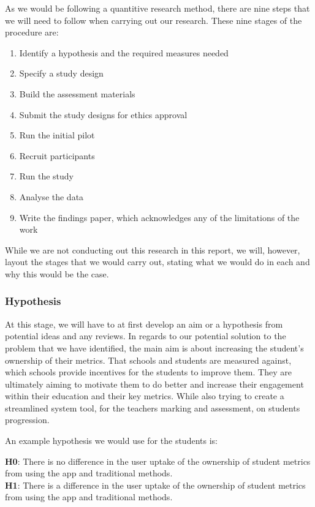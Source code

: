 \documentclass[sigchi]{acmart}
\begin{document}
As we would be following a quantitive research method, there are nine steps that we will need to follow when carrying out our research. These nine stages of the procedure are:

\begin{enumerate}
	
	\item Identify a hypothesis and the required measures needed
	\item Specify a study design
	\item Build the assessment materials
	\item Submit the study designs for ethics approval
	\item Run the initial pilot
	\item Recruit participants
	\item Run the study
	\item Analyse the data
	\item Write the findings paper, which acknowledges any of the limitations of the work
\end{enumerate}

While we are not conducting out this research in this report, we will, however, layout the stages that we would carry out, stating what we would do in each and why this would be the case. 

\subsubsection{Hypothesis}

At this stage, we will have to at first develop an aim or a hypothesis from potential ideas and any reviews. In regards to our potential solution to the problem that we have identified, the main aim is about increasing the student's ownership of their metrics. That schools and students are measured against, which schools provide incentives for the students to improve them. They are ultimately aiming to motivate them to do better and increase their engagement within their education and their key metrics. While also trying to create a streamlined system tool, for the teachers marking and assessment, on students progression.

An example hypothesis we would use for the students is:

\textbf{H0}: There is no difference in the user uptake of the ownership of student metrics from using the app and traditional methods.\\
\textbf{H1}: There is a difference in the user uptake of the ownership of student metrics from using the app and traditional methods.
\end{document}
